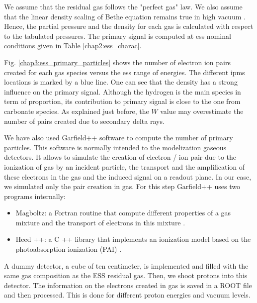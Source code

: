 \begin{refsection}
  We assume that the residual gas follows the "perfect gas" law. We also assume that the linear density scaling of Bethe equation remains true in high vacuum \cite[p. 446]{egber2012}\cite{Ishimaru1995}. Hence, the partial pressure and the density for each gas is calculated with respect to the tabulated pressures. The primary signal is computed at \acrshort{ess} nominal conditions given in Table \ref{chap2:ess_charac}.

  Fig. \ref{chap3:ess_primary_particles} shows the number of electron ion pairs created for each gas species versus the \acrshort{ess} range of energies. The different \acrshort{ipm}s locations is marked by a blue line. One can see that the density has a strong influence on the primary signal. Although the hydrogen is the main species in term of proportion, its contribution to primary signal is close to the one from carbonate species. As explained just before, the \(W\) value may overestimate the number of pairs created due to secondary delta rays.

  

  We have also used Garfield++ software to compute the number of primary particles. This software is normally intended to the modelization gaseous detectors. It allows to simulate the creation of electron / ion pair due to the ionization of gas by an incident particle, the transport and the amplification of these electrons in the gas and the induced signal on a readout plane. In our case, we simulated only the pair creation in gas. For this step Garfield++ uses two programs internally:
  \begin{itemize}
    \item Magboltz: a Fortran routine that compute different properties of a gas mixture and the transport of electrons in this mixture \cite{Biagi1989}.
    \item Heed ++: a C ++ library that implements an ionization model based on the photoabsorption ionization (PAI) \cite{Allison1980,Smirnov2005}.
  \end{itemize}

  A dummy detector, a cube of ten centimeter, is implemented and filled with the same gas composition as the ESS residual gas. Then, we shoot protons into this detector. The information on the electrons created in gas is saved in a ROOT file and then processed. This is done for different proton energies and vacuum levels.

  


\end{refsection}
